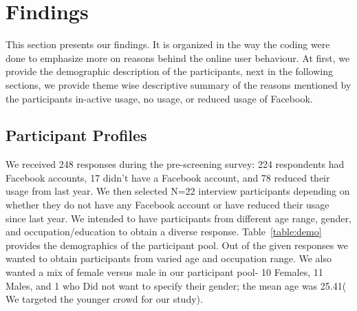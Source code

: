\section{Findings}
\label{sec:findings}
This section presents our findings. It is organized in the way the coding were done to emphasize more on reasons behind the online user behaviour. At first, we provide the demographic description of the participants, next in the following sections, we provide theme wise descriptive summary of the reasons mentioned by the participants in-active usage, no usage, or reduced usage of Facebook.
\subsection{Participant Profiles}
We received 248 responses during the pre-screening survey: 224 respondents had Facebook accounts, 17 didn't have a Facebook account, and 78 reduced their usage from last year. We then selected N=22 interview participants depending on whether they do not have any Facebook account or have reduced their usage since last year. We intended to have participants from different age range, gender, and occupation/education to obtain a diverse response. Table~\ref{table:demo} provides the demographics of the participant pool. Out of the given responses we wanted to obtain participants from varied age and occupation range. We also wanted a mix of female versus male in our participant pool- 10 Females, 11 Males, and 1 who Did not want to specify their gender; the mean age was 25.41( We targeted the younger crowd for our study). 
